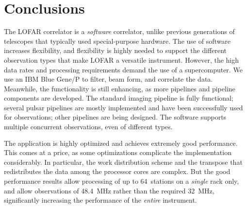 \section{Conclusions}
\label{sec:conclusions}



The LOFAR correlator is a \emph{software\/} correlator, unlike previous
generations of telescopes that typically used special-purpose hardware.
The use of software increases flexibility, and flexibility is highly needed
to support the different observation types that make LOFAR a versatile
instrument.
However, the high data rates and processing requirements demand the use of
a supercomputer.
We use an IBM Blue Gene/P to filter, beam form, and correlate the data.
Meanwhile, the functionality is still enhancing, as more pipelines and
pipeline components are developed.
The standard imaging pipeline is fully functional; several pulsar pipelines
are mostly implemented and have been successfully used for observations; other
pipelines are being designed.
The software supports multiple concurrent observations, even of different
types.

The application is highly optimized and achieves extremely good performance.
This comes at a price, as some optimizations complicate the implementation
considerably.
In particular, the work distribution scheme and the transpose that
redistributes the data among the processor cores are complex.
But the good performance results allow processing of up to 64~stations on a
\emph{single\/} rack only, and allow observations of 48.4~MHz rather than the
required 32~MHz, significantly increasing the performance of the
\emph{entire\/} instrument.


